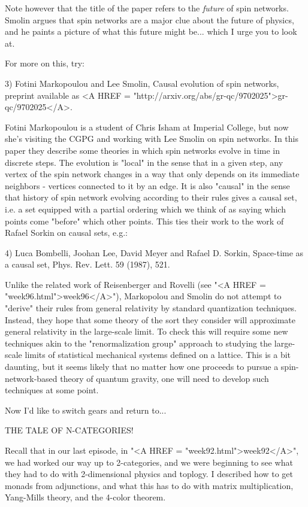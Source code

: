 Note however that the title of the paper refers to the \emph{future} of
spin networks.  Smolin argues that spin networks are a major clue
about the future of physics, and he paints a picture of what this
future might be... which I urge you to look at.

For more on this, try:


 3) Fotini Markopoulou and Lee Smolin, Causal evolution of spin
networks, preprint available as <A HREF =
"http://arxiv.org/abs/gr-qc/9702025">gr-qc/9702025</A>.

Fotini Markopoulou is a student of Chris Isham at Imperial College,
but now she's visiting the CGPG and working with Lee Smolin on spin
networks.  In this paper they describe some theories in which spin
networks evolve in time in discrete steps.  The evolution is "local"
in the sense that in a given step, any vertex of the spin network
changes in a way that only depends on its immediate neighbors -
vertices connected to it by an edge.  
It is also "causal" in the sense
that history of spin network evolving according to their rules gives
a causal set, i.e. a set equipped with a partial ordering which we think
of as saying which points come "before" which other points.  
This ties their work to the work of Rafael Sorkin on causal sets, e.g.:

4) Luca Bombelli, Joohan Lee, David Meyer and Rafael D. Sorkin, 
Space-time as a causal set, Phys. Rev. Lett. 59 (1987), 521.

Unlike the related work of Reisenberger and Rovelli (see "<A HREF
= "week96.html">week96</A>"), Markopolou and Smolin do not
attempt to "derive" their rules from general relativity by
standard quantization techniques.  Instead, they hope that some theory
of the sort they consider will approximate general relativity in the
large-scale limit.  To check this will require some new techniques
akin to the "renormalization group" approach to studying the
large-scale limits of statistical mechanical systems defined on a
lattice.  This is a bit daunting, but it seems likely that no matter
how one proceeds to pursue a spin-network-based theory of quantum
gravity, one will need to develop such techniques at some point.

Now I'd like to switch gears and return to...

THE TALE OF N-CATEGORIES!


Recall that in our last episode, in "<A HREF =
"week92.html">week92</A>", we had worked our way up to
2-categories, and we were beginning to see what they had to do with
2-dimensional physics and toplogy.  I described how to get monads from
adjunctions, and what this has to do with matrix multiplication,
Yang-Mills theory, and the 4-color theorem.


